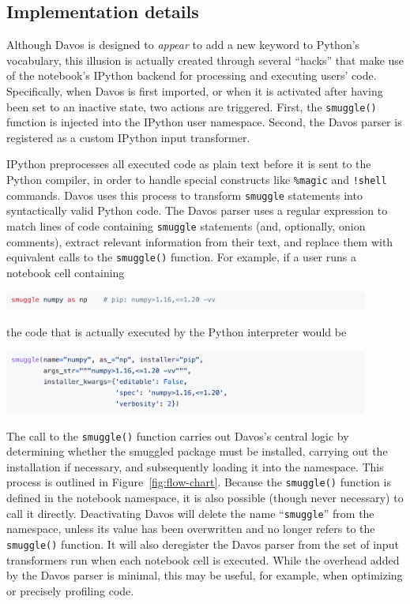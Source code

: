 \documentclass[preprint,12pt,a4paper]{elsarticle}
\begin{document}
\subsection{Implementation details}\label{subsec:implementation}

Although Davos is designed to \textit{appear} to add a new
keyword to Python's vocabulary, this illusion is actually created through
several ``hacks'' that make use of the notebook's IPython backend
for processing and executing users' code.  Specifically, when
Davos is first imported, or when it is activated after having been
set to an inactive state, two actions are triggered.  First, the
\texttt{smuggle()} function is injected into the IPython user
namespace.  Second, the Davos parser is registered as a
custom IPython input transformer.

IPython preprocesses all executed code as plain text before it is sent
to the Python compiler, in order to handle special constructs like
\texttt{\%magic} and \texttt{!shell} commands. Davos uses
this process to transform \texttt{smuggle} statements into
syntactically valid Python code. The Davos parser uses a
regular expression to match lines of code containing \texttt{smuggle}
statements (and, optionally, onion comments), extract relevant
information from their text, and replace them with equivalent calls to
the \texttt{smuggle()} function. For example, if a user runs a
notebook cell containing
\begin{center}
\includegraphics[width=0.9\textwidth]{figs/snippet6}
\end{center}
the code that is actually executed by the Python interpreter would be
\begin{center}
\includegraphics[width=0.9\textwidth]{figs/snippet7}
\end{center}
The call to the \texttt{smuggle()} function carries out
Davos's central logic by determining whether the smuggled
package must be installed, carrying out the installation if necessary,
and subsequently loading it into the namespace. This process is
outlined in Figure~\ref{fig:flow-chart}. Because the
\texttt{smuggle()} function is defined in the notebook namespace, it
is also possible (though never necessary) to call it
directly. Deactivating Davos will delete the name
``\texttt{smuggle}'' from the namespace, unless its value has been
overwritten and no longer refers to the \texttt{smuggle()}
function. It will also deregister the Davos parser from the
set of input transformers run when each notebook cell is
executed. While the overhead added by the Davos parser is
minimal, this may be useful, for example, when optimizing or precisely
profiling code.
\end{document}
